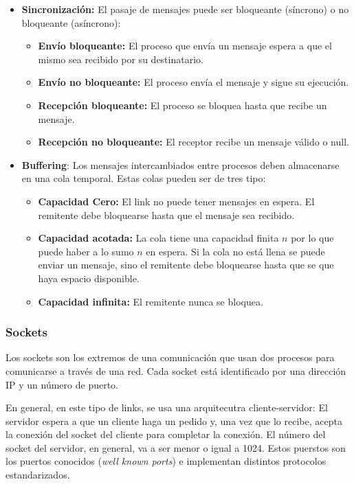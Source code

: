 \begin{itemize}
\begin{itemize}
    \end{itemize}
    \item \textbf{Sincronización:} El pasaje de mensajes puede ser bloqueante (síncrono) o no bloqueante (asíncrono):
    \begin{itemize}
        \item \textbf{Envío bloqueante:} El proceso que envía un mensaje espera a que el mismo sea recibido por su destinatario.
        \item \textbf{Envío no bloqueante:} El proceso envía el mensaje y sigue su ejecución.
        \item \textbf{Recepción bloqueante:} El proceso se bloquea hasta que recibe un mensaje.
        \item\textbf{Recepción no bloqueante:} El receptor recibe un mensaje válido o null.
    \end{itemize}
    \item \textbf{Buffering}: Los mensajes intercambiados entre procesos deben almacenarse en una cola temporal. Estas colas pueden ser de tres tipo:
    \begin{itemize}
        \item\textbf{Capacidad Cero:} El link no puede tener mensajes en espera. El remitente debe bloquearse hasta que el mensaje sea recibido.
        \item \textbf{Capacidad acotada:} La cola tiene una capacidad finita $n$ por lo que puede haber a lo sumo $n$ en espera. Si la cola no está llena se puede enviar un mensaje, sino el remitente debe bloquearse hasta que se que haya espacio disponible.
        \item \textbf{Capacidad infinita:} El remitente nunca se bloquea.
    \end{itemize}
\end{itemize}

\subsubsection{Sockets}
Los sockets son los extremos de una comunicación que usan dos procesos para comunicarse a través de una red. Cada socket está identificado por una dirección IP y un número de puerto. 	

En general, en este tipo de links, se usa una arquitecutra cliente-servidor: El servidor espera a que un cliente haga un pedido y, una vez que lo recibe, acepta la conexión del socket del cliente para completar la conexión. El número del socket del servidor, en general, va a ser menor o igual a 1024. Estos puerstos son los puertos conocidos (\textit{well known ports}) e implementan distintos protocolos estandarizados.

